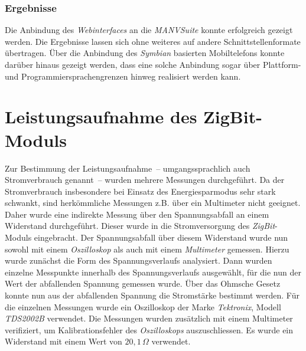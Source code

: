 \subsubsection{Ergebnisse}
Die Anbindung des \emph{Webinterfaces} an die \emph{MANVSuite} konnte erfolgreich gezeigt werden. Die
Ergebnisse lassen sich ohne weiteres auf andere Schnittstellenformate übertragen. Über die Anbindung
des \emph{Symbian} basierten Mobiltelefons konnte darüber hinaus gezeigt werden, dass eine solche
Anbindung sogar über Plattform- und Programmiersprachengrenzen hinweg realisiert werden kann. 

\section{Leistungsaufnahme des ZigBit-Moduls}
Zur Bestimmung der Leistungsaufnahme~-- umgangssprachlich auch Strom\-ver\-brauch genannt~-- wurden mehrere Messungen 
durchgeführt.
Da der Stromverbrauch insbesondere bei Einsatz des Energiesparmodus sehr stark schwankt, sind herkömmliche Messungen
z.B. über ein Multimeter nicht geeignet. Daher wurde eine indirekte Messung über den Spannungsabfall an einem 
Widerstand durchgeführt. Dieser wurde in die Stromversorgung des \emph{ZigBit}-Moduls eingebracht. Der 
Spannungsabfall über diesem Widerstand wurde nun sowohl mit einem \emph{Oszilloskop} als auch mit einem \emph{Multimeter}
gemessen. Hierzu wurde zunächst die Form des Spannungsverlaufs analysiert. Dann wurden einzelne Messpunkte innerhalb 
des Spannungsverlaufs ausgewählt, für die nun der Wert der abfallenden Spannung gemessen wurde. Über das Ohmsche Gesetz 
konnte nun aus der abfallenden
Spannung die Stromstärke bestimmt werden. Für die einzelnen Messungen wurde ein Oszilloskop der Marke \emph{Tektronix}, 
Modell \emph{TDS2002B} verwendet. Die Messungen wurden zusätzlich mit einem Multimeter verifiziert,
um Kalibrationsfehler des \emph{Oszilloskops} auszuschliessen. Es wurde ein Widerstand mit einem Wert von $20,1\,\Omega$
verwendet.

